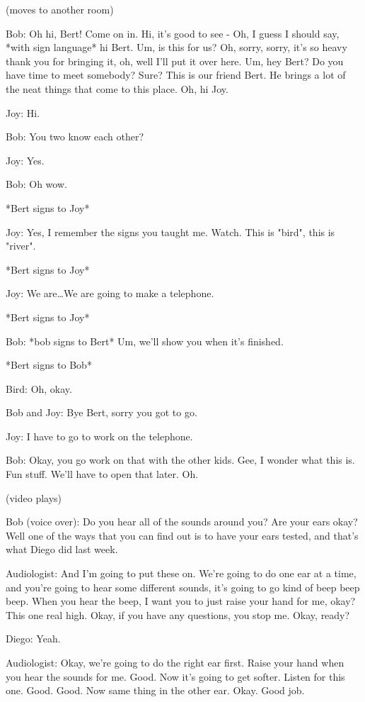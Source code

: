 (moves to another room)

Bob: Oh hi, Bert! Come on in. Hi, it's good to see - Oh, I guess I should say, *with sign language* hi Bert. Um, is this for us? Oh, sorry, sorry, it's so heavy thank you for bringing it, oh, well I'll put it over here. Um, hey Bert? Do you have time to meet somebody? Sure? This is our friend Bert. He brings a lot of the neat things that come to this place. Oh, hi Joy.

Joy: Hi.

Bob: You two know each other?

Joy: Yes.

Bob: Oh wow.

*Bert signs to Joy*

Joy: Yes, I remember the signs you taught me. Watch. This is "bird", this is "river".

*Bert signs to Joy*

Joy: We are\dots We are going to make a telephone.

*Bert signs to Joy*

Bob: *bob signs to Bert* Um, we'll show you when it's finished.

*Bert signs to Bob*

Bird: Oh, okay.

Bob and Joy: Bye Bert, sorry you got to go.

Joy: I have to go to work on the telephone.

Bob: Okay, you go work on that with the other kids. Gee, I wonder what this is. Fun stuff. We'll have to open that later. Oh.

(video plays)

Bob (voice over): Do you hear all of the sounds around you? Are your ears okay? Well one of the ways that you can find out is to have your ears tested, and that's what Diego did last week.

Audiologist: And I'm going to put these on. We're going to do one ear at a time, and you're going to hear some different sounds, it's going to go kind of beep beep beep. When you hear the beep, I want you to just raise your hand for me, okay? This one real high. Okay, if you have any questions, you stop me. Okay, ready?

Diego: Yeah.

Audiologist: Okay, we're going to do the right ear first. Raise your hand when you hear the sounds for me. Good. Now it's going to get softer. Listen for this one. Good. Good. Now same thing in the other ear. Okay. Good job.

